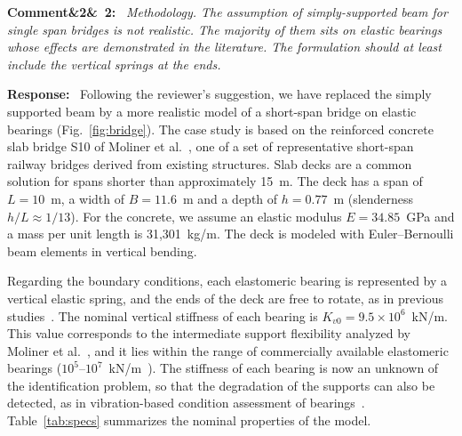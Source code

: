 \documentclass[11pt]{article}
\newenvironment{rcomment}[1]{\par\bigskip\noindent\textbf{Comment\ifx&#1&\else\ #1\fi:}\ \itshape}{\par}
\newenvironment{response}{\par\smallskip\noindent\color{resp}\textbf{Response:}\ }{\par}
\begin{document}
\begin{rcomment}{2}
Methodology. The assumption of simply-supported beam for single span bridges is not realistic. 
The majority of them sits on elastic bearings whose effects are demonstrated in the literature. 
The formulation should at least include the vertical springs at the ends.
\end{rcomment}

\begin{response}
Following the reviewer's suggestion, we have replaced the simply supported beam by a more realistic model of a short-span bridge on elastic bearings (Fig.~\ref{fig:bridge}).
The case study is based on the reinforced concrete slab bridge S10 of Moliner et al.~\cite{moliner2017dynamic}, one of a set of representative short-span railway bridges derived from existing structures.
Slab decks are a common solution for spans shorter than approximately 15~m.
The deck has a span of $L=10$~m, a width of $B=11.6$~m and a depth of $h=0.77$~m (slenderness $h/L\approx1/13$).
For the concrete, we assume an elastic modulus $E=34.85$~GPa and a mass per unit length is 31,301~kg/m.
The deck is modeled with Euler--Bernoulli beam elements in vertical bending.

Regarding the boundary conditions, each elastomeric bearing is represented by a vertical elastic spring, and the ends of the deck are free to rotate, as in previous studies~\cite{elborgi2005modal,moliner2017dynamic,erduran2022effect}.
The nominal vertical stiffness of each bearing is $K_{v0}=9.5\times10^{6}$~kN/m.
This value corresponds to the intermediate support flexibility analyzed by Moliner et al.~\cite{moliner2017dynamic}, and it lies within the range of commercially available elastomeric bearings ($10^{5}$--$10^{7}$~kN/m~\cite{erduran2022effect}).
The stiffness of each bearing is now an unknown of the identification problem, so that the degradation of the supports can also be detected, as in vibration-based condition assessment of bearings~\cite{fayyadh2012condition}.
Table~\ref{tab:specs} summarizes the nominal properties of the model.
\end{response}
\end{document}

